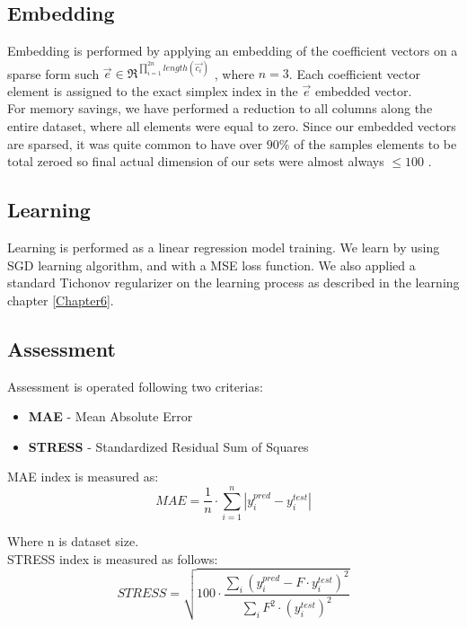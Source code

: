 \subsection{Embedding}
Embedding is performed by applying an embedding of the coefficient vectors on a sparse form such $\overrightarrow{e} \in \Re^{\prod_{i=1}^{2n}{length(\overrightarrow{c_i})}}$ , where $n = 3$.
Each coefficient vector element is assigned to the exact simplex index in the $\overrightarrow{e}$ embedded vector.
\\
For memory savings, we have performed a reduction to all columns along the entire dataset, where all elements were equal to zero.
Since our embedded vectors are sparsed, it was quite common to have over $90 \% $ of the samples elements to be total zeroed so final actual dimension of our sets were almost always $ \le 100$ .

\subsection{Learning}
Learning is performed as a linear regression model training.
We learn by using SGD \cite{SGD} learning algorithm, and with a MSE \cite{MSE} loss function.
We also applied a standard Tichonov \cite{Tichonov} regularizer on the learning process as described in the learning chapter \ref{Chapter6}.


\subsection{Assessment}
Assessment is operated following two criterias:
\begin{itemize}
\item \textbf{MAE} - Mean Absolute Error
\item \textbf{STRESS} - Standardized Residual Sum of Squares \cite{STRESS} \\
\end{itemize}

MAE index is measured as:
\begin{equation}
MAE = \frac{1}{n} \cdot \sum_{i = 1}^{n}{|y^{pred}_i - y^{test}_i|}
\end{equation}

Where n is dataset size. \\

STRESS index is measured as follows:
\begin{equation}
STRESS = \sqrt{100 \cdot \dfrac{\sum\limits_{i}{(y^{pred}_i - F \cdot y^{test}_i)^2}}{\sum\limits_{i}^{}{F^2 \cdot (y^{test}_i)^2 }}}
\end{equation}

